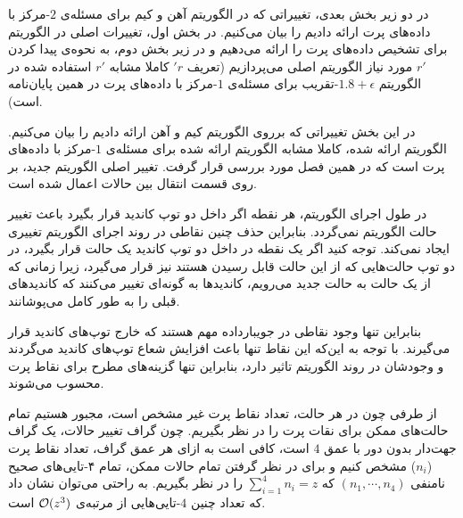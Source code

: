 در دو زیر بخش بعدی، تغییراتی که در الگوریتم آهن و کیم برای مسئله‌ی $2$-مرکز با داده‌های پرت ارائه دادیم را بیان می‌کنیم. در بخش اول، تغییرات اصلی در الگوریتم برای تشخیص داده‌های پرت را ارائه می‌دهیم و در زیر بخش دوم، به نحوه‌ی پیدا کردن $r'$ مورد نیاز الگوریتم اصلی می‌پردازیم (تعریف $'r$ کاملا مشابه $r'$ استفاده شده در الگوریتم $1.8 + \epsilon$-تقریب برای مسئله‌ی $1$-مرکز با داده‌های پرت در همین پایان‌نامه است).


در این بخش تغییراتی که برروی الگوریتم کیم و آهن ارائه دادیم را بیان می‌کنیم. الگوریتم ارائه شده، کاملا مشابه الگوریتم ارائه شده برای مسئله‌ی $1$-مرکز با داده‌های پرت است که در همین فصل مورد بررسی قرار گرفت. تغییر اصلی الگوریتم جدید، بر روی قسمت انتقال بین حالات اعمال شده است. 

در طول اجرای الگوریتم، هر نقطه اگر داخل دو توپ کاندید قرار بگیرد باعث تغییر حالت الگوریتم نمی‌گردد. بنابراین حذف چنین نقاطی در روند اجرای الگوریتم تغییری ایجاد نمی‌کند. توجه کنید اگر یک نقطه در داخل دو توپ کاندید یک حالت قرار بگیرد، در دو توپ حالت‌هایی که از این حالت قابل رسیدن هستند نیز‌ قرار می‌گیرد، زیرا زمانی که از یک حالت به حالت جدید می‌رویم، کاندیدها به گونه‌ای تغییر می‌کنند که کاندید‌های قبلی را به طور کامل می‌پوشانند.

بنابراین تنها وجود نقاطی در جویبارداده مهم هستند که خارج توپ‌های کاندید قرار می‌گیرند. با توجه به این‌که این نقاط تنها باعث افزایش شعاع توپ‌های کاندید می‌گردند و وجودشان در روند الگوریتم تاثیر دارد، بنابراین تنها گزینه‌های مطرح برای نقاط پرت محسوب می‌شوند. 

از طرفی چون در هر حالت، تعداد نقاط پرت غیر مشخص است، مجبور هستیم تمام حالت‌های ممکن برای نقات پرت را در نظر بگیریم. چون گراف تغییر حالات، یک گراف جهت‌دار بدون دور با عمق $4$ است، کافی است به ازای هر عمق گراف، تعداد نقاط پرت ($n_i$) مشخص کنیم و برای در نظر گرفتن تمام حالات ممکن، تمام ۴‌-تایی‌های صحیح نامنفی $(n_1, \cdots, n_4)$  که $\sum_{i =1}^{4} n_i = z$ را در نظر بگیریم. به راحتی می‌توان نشان داد که تعداد چنین $4$-تایی‌هایی از مرتبه‌ی $\mathcal{O}(z^3)$ است.

